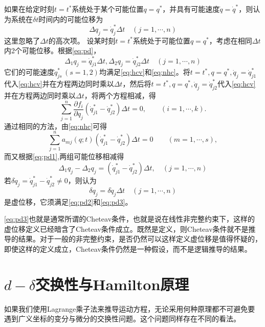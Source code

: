 \documentclass[a4paper,UTF8,11pt,hyperref]{ctexart}
\begin{document}
如果在给定时刻$t=t^*$系统处于某个可能位置$q=q^*$，并具有可能速度$\dot{q}=\dot{q}^*$，则认为系统在$\delta t$时间内的可能位移为
\begin{equation}\label{eq:pd}
\Delta q_j=\dot{q}_j^* \Delta t\quad(j=1,\cdots,n)
\end{equation}
这里忽略了$\Delta t$的高次项。
设某时刻$t=t^*$系统处于可能位置$q=q^*$，考虑在相同$\Delta t$内2个可能位移。根据\eqref{eq:pd}，
\begin{equation}\label{eq:pd1}
\Delta_1 q_j=\dot{q}_{j1}^* \Delta t, \Delta_2 q_j=\dot{q}_{j2}^* \Delta t\quad(j=1,\cdots,n)
\end{equation}
它们的可能速度$\dot{q}_{js}^*\,(s=1,2)$均满足\eqref{eq:hcv}和\eqref{eq:nhc}。将$t=t^*,q=q^*,\dot{q}_j=\dot{q}_{j1}^*$代入\eqref{eq:hcv}并在方程两边同时乘以$\Delta t$，然后将$t=t^*,q=q^*,\dot{q}_j=\dot{q}_{j2}^*$代入\eqref{eq:hcv}并在方程两边同时乘以$\Delta t$，将两个方程相减，得
\begin{equation}\label{eq:pd2}
 \sum^n_{j = 1} \frac{\partial f_i}{\partial q_j}
   (\dot{q}_{j1}^* -\dot{q}_{j2}^*)\Delta t=0, \hspace{2em} ( i = 1, \cdots,
   k) .
\end{equation}
通过相同的方法，由\eqref{eq:nhc}可得
\begin{equation}\label{eq:pd3}
  \sum_{j = 1}^n a_{m j} ( q ; t) (\dot{q}_{j1}^*-\dot{q}_{j2}^*)\Delta t = 0 \hspace{2em} ( m =
  1, \cdots, s), 
\end{equation}
而又根据\eqref{eq:pd1},两组可能位移相减得
\begin{equation}
\Delta_1 q_j-\Delta_2 q_j=(\dot{q}_{j1}^* -\dot{q}_{j2}^* )\Delta t,\quad(j=1,\cdots,n)
\end{equation}
若$\delta\dot{q}_j=\dot{q}_{j1}^* -\dot{q}_{j2}^*\neq0$，则认为
\begin{equation}
\delta q_j=\delta\dot{q}_j\Delta t\quad(j=1,\cdots,n)
\end{equation}
是虚位移，它须满足\eqref{eq:pd2}和\eqref{eq:pd3}。


\eqref{eq:pd3}也就是通常所谓的Cheteav条件，也就是说在线性非完整约束下，这样的虚位移定义已经暗含了Cheteav条件成立。既然是定义，则Cheteav条件就不是推导的结果。对于一般的非完整约束，是否仍然可以这样定义虚位移是值得怀疑的，即使这样的定义成立，Cheteav条件仍然是一种假设，而不是逻辑推导的结果。

\section{$d-\delta$交换性与Hamilton原理}
如果我们使用Lagrange乘子法来推导运动方程，无论采用何种原理都不可避免要遇到广义坐标的变分与微分的交换性问题。这个问题同样存在不同的看法\supercite{mei1985,mei1987,Flannery201102}。
\end{document}

